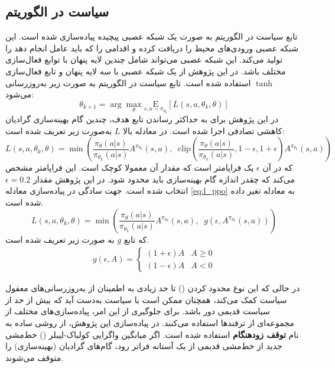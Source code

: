 \subsection{
    سیاست در الگوریتم 
}
تابع سیاست در الگوریتم  به صورت یک شبکه عصبی پیچیده پیاده‌سازی شده است. این شبکه عصبی ورودی‌های محیط را دریافت کرده و اقدامی را که باید عامل انجام دهد را تولید می‌کند. این شبکه عصبی می‌تواند شامل چندین لایه پنهان با توابع فعال‌سازی مختلف باشد. در این پژوهش از یک شبکه عصبی با سه لایه پنهان و تابع فعال‌سازی 
\(\tanh\)
استفاده شده است.
تابع سیاست در الگوریتم  به صورت زیر به‌روز‌رسانی می‌شود:
\begin{equation}
    \theta_{k+1} = \arg \max_{\theta} \underset{s,a \sim \pi_{\theta_k}}{{\mathrm E}}\left[
        L(s,a,\theta_k, \theta)\right]
\end{equation}
در این پژوهش برای به حداکثر رساندن تابع هدف، چندین گام بهینه‌سازی 
گرادیان کاهشی تصادفی
اجرا شده است.
در معادله بالا
\(L\)
به‌صورت زیر تعریف شده است:
\begin{equation}
	\label{eq:l_ppo}
    L(s,a,\theta_k,\theta) = \min\left(
    \frac{\pi_{\theta}(a|s)}{\pi_{\theta_k}(a|s)}  A^{\pi_{\theta_k}}(s,a), \;\;
    \text{clip}\left(\frac{\pi_{\theta}(a|s)}{\pi_{\theta_k}(a|s)}, 1 - \epsilon, 1+\epsilon \right) A^{\pi_{\theta_k}}(s,a)
    \right)
\end{equation}
که در آن
\(\epsilon\)
یک فراپامتر است که مقدار آن معمولا کوچک است.
این فراپامتر مشخص می‌کند که چقدر اندازه گام بهینه‌سازی باید محدود شود.
در این پژوهش مقدار 
\(\epsilon = 0.2\)
انتخاب شده است. جهت سادگی در پیاده‌سازی معادله \eqref{eq:l_ppo} به معادله تغیر داده شده است.
\begin{equation}
	L(s,a,\theta_k,\theta) = \min\left(
	\frac{\pi_{\theta}(a|s)}{\pi_{\theta_k}(a|s)}  A^{\pi_{\theta_k}}(s,a), \;\;
	g(\epsilon, A^{\pi_{\theta_k}}(s,a))
	\right)
\end{equation}
که تابع \(g\) به صورت زیر تعریف شده است.
\begin{align}
	g(\epsilon, A) = \left\{
	\begin{array}{ll}
		(1 + \epsilon) A & A \geq 0 \\
		(1 - \epsilon) A & A < 0
	\end{array}
	\right.
\end{align}

در حالی که این نوع محدود کردن 
()
 تا حد زیادی به اطمینان از به‌روزرسانی‌های معقول سیاست کمک می‌کند، همچنان ممکن است با سیاست به‌دست آید که بیش از حد از سیاست قدیمی دور باشد. برای جلوگیری از این امر، پیاده‌سازی‌های مختلف  از مجموعه‌ای از ترفندها استفاده می‌کنند. در پیاده‌سازی این پژوهش، از روشی ساده به نام
  \textbf{توقف زودهنگام}
   استفاده شده است. اگر میانگین واگرایی کولباک-لیبلر () خط‌مشی جدید از خط‌مشی قدیمی از یک آستانه فراتر رود، گام‌های گرادیان (بهینه‌سازی) را متوقف می‌شوند. 
   
